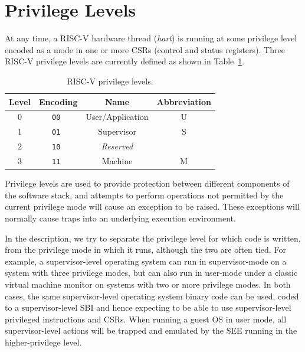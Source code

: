 \section{Privilege Levels}

At any time, a RISC-V hardware thread ({\em hart}) is running at some
privilege level encoded as a mode in one or more CSRs (control and
status registers).  Three RISC-V privilege levels are currently defined
as shown in Table~\ref{privlevels}.

\begin{table}[h!]
\begin{center}
\begin{tabular}{|c|c|c|c|}
  \hline
   Level & Encoding & Name      & Abbreviation \\ \hline  
   0     & \tt 00   & User/Application & U     \\ 
   1     & \tt 01   & Supervisor & S           \\ 
   2     & \tt 10   & {\em Reserved} &            \\ 
   3     & \tt 11   & Machine    & M           \\ 
  \hline
 \end{tabular}
\end{center}
\caption{RISC-V privilege levels.}
\label{privlevels}
\end{table}

Privilege levels are used to provide protection between different
components of the software stack, and attempts to perform operations
not permitted by the current privilege mode will cause an exception to
be raised.  These exceptions will normally cause traps into an
underlying execution environment.

\begin{commentary}
In the description, we try to separate the privilege level for which
code is written, from the privilege mode in which it runs, although
the two are often tied.  For example, a supervisor-level operating
system can run in supervisor-mode on a system with three privilege
modes, but can also run in user-mode under a classic virtual machine
monitor on systems with two or more privilege modes.  In both cases,
the same supervisor-level operating system binary code can be used,
coded to a supervisor-level SBI and hence expecting to be able to use
supervisor-level privileged instructions and CSRs.  When running a
guest OS in user mode, all supervisor-level actions will be trapped
and emulated by the SEE running in the higher-privilege level.
\end{commentary}

